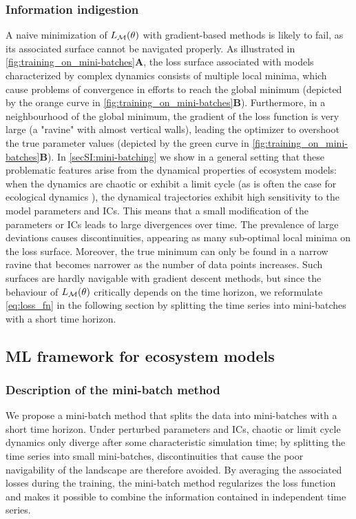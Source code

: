 \subsubsection{Information indigestion}
A naive minimization of $L_{\mathcal{M}}(\theta)$ with gradient-based methods is likely to fail, as its associated surface cannot be navigated properly. As illustrated in \cref{fig:training_on_mini-batches}\textbf{A}, the loss surface associated with models characterized by complex dynamics consists of multiple local minima, which cause problems of convergence in efforts to reach the global minimum (depicted by the orange curve in \cref{fig:training_on_mini-batches}\textbf{B}). Furthermore, in a neighbourhood of the global minimum, the gradient of the loss function is very large (a "ravine" with almost vertical walls), leading the optimizer to overshoot the true parameter values (depicted by the green curve in \cref{fig:training_on_mini-batches}\textbf{B}).
%
In \cref{secSI:mini-batching} we show in a general setting that these problematic features arise from the dynamical properties of ecosystem models: when the dynamics are chaotic or exhibit a limit cycle (as is often the case for ecological dynamics \citep{Bjornstad2001,Hastings1993,Huisman1999,Beninca2008}), the dynamical trajectories exhibit high sensitivity to the model parameters and ICs. This means that a small modification of the parameters or ICs leads to large divergences over time. 
%
The prevalence of large deviations causes discontinuities, appearing as many sub-optimal local minima on the loss surface. Moreover, the true minimum can only be found in a narrow ravine that becomes narrower as the number of data points increases.
% 
Such surfaces are hardly navigable with gradient descent methods, but since the behaviour of $L_{\mathcal{M}}(\theta)$ critically depends on the time horizon, we reformulate \cref{eq:loss_fn} in the following section by splitting the time series into mini-batches with a short time horizon. 

\subsection{ML framework for ecosystem models}

\subsubsection{Description of the mini-batch method}
We propose a mini-batch method that splits the data into mini-batches with a short time horizon. Under perturbed parameters and ICs, chaotic or limit cycle dynamics only diverge after some characteristic simulation time; by splitting the time series into small mini-batches, discontinuities that cause the poor navigability of the landscape are therefore avoided. By averaging the associated losses during the training, the mini-batch method regularizes the loss function and makes it possible to combine the information contained in independent time series.

